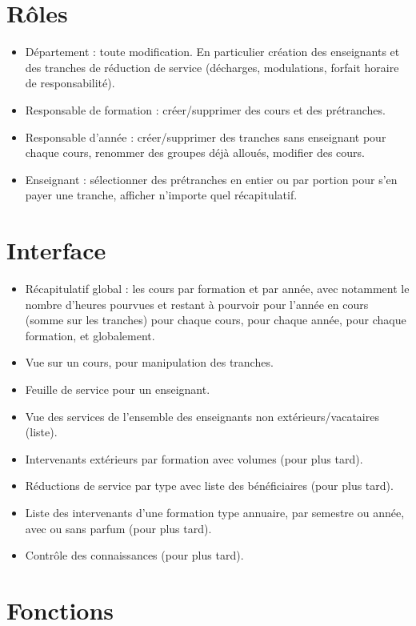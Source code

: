 \documentclass{article}
\begin{document}
\section{Rôles}

\begin{itemize}
\item Département : toute modification. En particulier création des enseignants et des tranches de réduction de service (décharges, modulations, forfait horaire de responsabilité).
\item Responsable de formation : créer/supprimer des cours et des prétranches.
\item Responsable d'année : créer/supprimer des tranches sans enseignant pour chaque cours, renommer des groupes déjà alloués, modifier des cours.
\item Enseignant : sélectionner des prétranches en entier ou par portion pour s'en payer une tranche, afficher n'importe quel récapitulatif.
\end{itemize}

\section{Interface}
\begin{itemize}
\item Récapitulatif global : les cours par formation et par année, avec notamment le nombre d'heures pourvues et restant à pourvoir pour l'année en cours (somme sur les tranches) pour chaque cours, pour chaque année, pour chaque formation, et globalement.
\item Vue sur un cours, pour manipulation des tranches.
\item Feuille de service pour un enseignant.
\item Vue des services de l'ensemble des enseignants non extérieurs/vacataires (liste).
\item Intervenants extérieurs par formation avec volumes (pour plus tard).
\item Réductions de service par type avec liste des bénéficiaires (pour plus tard).
\item Liste des intervenants d'une formation type annuaire, par semestre ou année, avec ou sans parfum (pour plus tard).
\item Contrôle des connaissances (pour plus tard).
\end{itemize}


\section{Fonctions}
\end{document}
